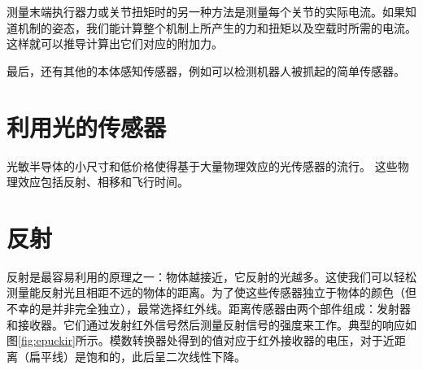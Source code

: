 测量末端执行器力或关节扭矩时的另一种方法是测量每个关节的实际电流。如果知道机制的姿态，我们能计算整个机制上所产生的力和扭矩以及空载时所需的电流。这样就可以推导计算出它们对应的附加力。


最后，还有其他的本体感知传感器，例如可以检测机器人被抓起的简单传感器。



\section{利用光的传感器}
光敏半导体的小尺寸和低价格使得基于大量物理效应的光传感器的流行。 这些物理效应包括反射、相移和飞行时间。


\section{反射}

反射是最容易利用的原理之一：物体越接近，它反射的光越多。这使我们可以轻松测量能反射光且相距不远的物体的距离。为了使这些传感器独立于物体的颜色（但不幸的是并非完全独立），最常选择红外线。距离传感器由两个部件组成：发射器和接收器。它们通过发射红外信号然后测量反射信号的强度来工作。典型的响应如图\ref{fig:epuckir}所示。模数转换器处得到的值对应于红外接收器的电压，对于近距离（扁平线）是饱和的，此后呈二次线性下降。


